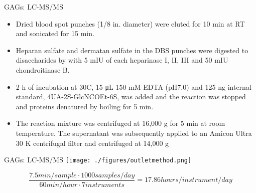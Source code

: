 \documentclass[presentation, smaller]{beamer}
\begin{document}
\begin{frame}[label={sec:orgheadline15}]{GAGs: LC-MS/MS}
\begin{itemize}
\item Dried blood spot punches (1/8 in. diameter) were eluted for 10 min at RT and sonicated for 15 min.
\item Heparan sulfate and dermatan sulfate in the DBS punches were
digested to disaccharides by with 5 mIU of each heparinase I, II,
III and 50 mIU chondroitinase B.
\item 2 h of incubation at 30\degree C, 15 μL 150 mM EDTA (pH7.0) and
125 ng internal standard, 4UA-2S-GlcNCOEt-6S, was added and the
reaction was stopped and proteins denatured by boiling for 5 min.
\item The reaction mixture was centrifuged at 16,000 g for 5 min at room
temperature. The supernatant was subsequently applied to an Amicon
Ultra 30 K centrifugal filter and centrifuged at 14,000 g
\end{itemize}
\end{frame}

\begin{frame}[label={sec:orgheadline16}]{GAGs: LC-MS/MS}
\texttt{[image: ./figures/outletmethod.png]}


\[
\frac{7.5 min/sample \cdot 1000 samples/day}{60 min/hour \cdot 7 instruments}
= 17.86 hours/instrument/day
\]
\end{frame}
\end{document}
